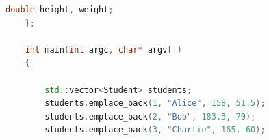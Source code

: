 \documentclass [11pt,a4paper,dvipdfmx] {jarticle}
\begin{document}
\begin{lstlisting}[language=C++]
      double height, weight;                                                                                                                                                                                                                                                        
    };                                                                                                                                                                                                                                                                              
                                                                                                                                                                                                                                                                                    
    int main(int argc, char* argv[])                                                                                                                                                                                                                                                
    {                                                                                                                                                                                                                                                                               
                                                                                                                                                                                                                                                                                    
        std::vector<Student> students;                                                                                                                                                                                                                                                
        students.emplace_back(1, "Alice", 158, 51.5);                                                                                                                                                                                                                                 
        students.emplace_back(2, "Bob", 183.3, 70);                                                                                                                                                                                                                                   
        students.emplace_back(3, "Charlie", 165, 60);                                                                                                                                                                                                                                 
                                                                                                                                                                                                                                                                                    

\end{lstlisting}
\end{document}
